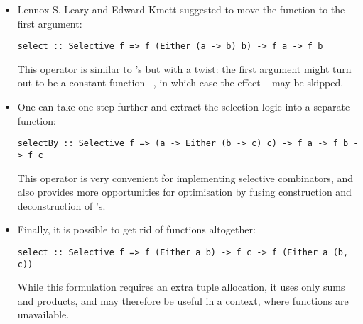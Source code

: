 \begin{itemize}
    \item Lennox S. Leary and Edward Kmett suggested to move the function to the
          first argument:

\vspace{1mm}
\begin{verbatim}
select :: Selective f => f (Either (a -> b) b) -> f a -> f b
\end{verbatim}
\vspace{1mm}

          This operator is similar to 's \hs{<*>} but with a
          twist: the first argument might turn out to be a constant function
          ~, in which case the effect ~ may be
          skipped.

    \item One can take one step further and extract the selection logic into a
          separate function:

\vspace{1mm}
\begin{verbatim}
selectBy :: Selective f => (a -> Either (b -> c) c) -> f a -> f b -> f c
\end{verbatim}
\vspace{1mm}

         This operator is very convenient for implementing selective
         combinators, and also provides more opportunities for optimisation by
         fusing construction and deconstruction of 's.

    \item Finally, it is possible to get rid of functions altogether:

\vspace{1mm}
\begin{verbatim}
select :: Selective f => f (Either a b) -> f c -> f (Either a (b, c))
\end{verbatim}
\vspace{1mm}

          While this formulation requires an extra tuple allocation, it uses
          only sums and products, and may therefore be useful in a context,
          where functions are unavailable.
\end{itemize}





